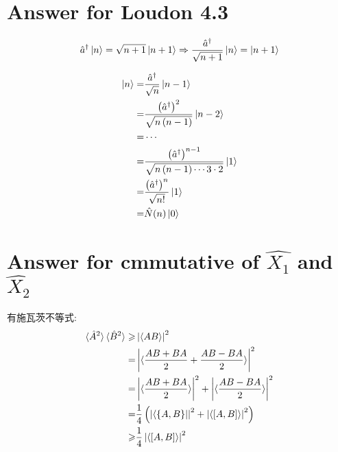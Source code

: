 \documentclass[twoside]{article}
\begin{document}
\section*{Answer for Loudon 4.3}

\begin{equation*}
    \hat{a}^\dagger \ket{n} = \sqrt{n+1}\ket{n+1} \Rightarrow \frac{\hat{a}^\dagger}{\sqrt{n+1}}\ket{n} = \ket{n+1}
\end{equation*}

\begin{equation*}
    \begin{split}
        \ket{n} = & \frac{\hat{a}^\dagger}{\sqrt{n}}\ket{n-1}                                                    \\
        =         & \frac{\left(\hat{a}^\dagger\right)^2}{\sqrt{n\left(n-1\right)}}\ket{n-2}                     \\
        =         & \cdots                                                                                       \\
        =         & \frac{\left(\hat{a}^\dagger\right)^{n-1}}{\sqrt{n\left(n-1\right) \cdots 3 \cdot  2}}\ket{1} \\
        =         & \frac{\left(\hat{a}^\dagger\right)^{n}}{\sqrt{n!}}\ket{1}                                    \\
        =         & \hat{N}(n) \ket{0}
    \end{split}
\end{equation*}


\section*{Answer for cmmutative of $\hat{X_1}$ and $\hat{X_2}$}

有施瓦茨不等式:
\begin{equation*}
    \begin{split}
        \braket{\hat{A}^2}\braket{\hat{B}^2} \geqslant & \left|\braket{AB}\right|^2                                                                                   \\
        =                                              & \left|\braket{\frac{AB + BA}{2} + \frac{AB - BA}{2}}\right|^2                                                \\
        =                                              & \left|\braket{\frac{AB + BA}{2}}\right|^2 + \left|\braket{\frac{AB - BA}{2}}\right|^2                        \\
        =                                              & \frac{1}{4}\left(\left|\bra{\left\{A, B\right\}}\right|^2 + \left|\braket{\left[A, B\right]}\right|^2\right) \\
        \geqslant                                      & \frac{1}{4} \left|\braket{\left[A, B\right]}\right|^2
    \end{split}
\end{equation*}
\end{document}
